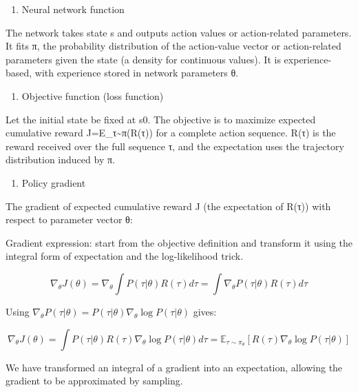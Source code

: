 \begin{enumerate}
\def\labelenumi{\arabic{enumi}.}
\setcounter{enumi}{1}
\tightlist
\item
  Neural network function
\end{enumerate}

The network takes state s and outputs action values or action-related parameters. It fits π, the probability distribution of the action-value vector or action-related parameters given the state (a density for continuous values). It is experience-based, with experience stored in network parameters θ.

\begin{enumerate}
\def\labelenumi{\arabic{enumi}.}
\setcounter{enumi}{2}
\tightlist
\item
  Objective function (loss function)
\end{enumerate}

Let the initial state be fixed at s0. The objective is to maximize expected cumulative reward J=E\_τ\textasciitilde π(R(τ)) for a complete action sequence. R(τ) is the reward received over the full sequence τ, and the expectation uses the trajectory distribution induced by π.

\begin{enumerate}
\def\labelenumi{\arabic{enumi}.}
\setcounter{enumi}{3}
\tightlist
\item
  Policy gradient
\end{enumerate}

The gradient of expected cumulative reward J (the expectation of R(τ)) with respect to parameter vector θ:

Gradient expression: start from the objective definition and transform it using the integral form of expectation and the log-likelihood trick.

\[
\nabla_\theta J(\theta)
=\nabla_\theta\int P(\tau|\theta)R(\tau)d\tau
=\int\nabla_\theta P(\tau|\theta)R(\tau)d\tau
\]

Using \(\nabla_\theta P(\tau|\theta)=P(\tau|\theta)\nabla_\theta\log P(\tau|\theta)\) gives:

\[
\nabla_\theta J(\theta)
=\int P(\tau|\theta)R(\tau)\nabla_\theta\log P(\tau|\theta)d\tau
=\mathbb{E}_{\tau\sim\pi_\theta}\left[R(\tau)\nabla_\theta\log P(\tau|\theta)\right]
\]

We have transformed an integral of a gradient into an expectation, allowing the gradient to be approximated by sampling.

